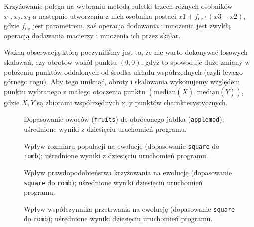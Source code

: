 \documentclass[a4paper,12pt,leqno]{article}
\newcommand{\median}{\mathrm{median}}
\begin{document}
Krzyżowanie polega na wybraniu metodą ruletki trzech różnych osobników $x_1, x_2, x_3$ a następnie utworzeniu z nich osobnika postaci
$x1 + f_\text{de}\cdot(x3-x2)$, gdzie $f_\text{de}$ jest parametrem, zaś operacja dodawania i mnożenia jest zwykłą operacją dodawania
macierzy i mnożenia ich przez skalar.

Ważną obserwacją którą poczyniliśmy jest to, że nie warto dokonywać losowych skalowań, czy obrotów wokół punktu $(0,0)$, gdyż to spowoduje duże
zmiany w położeniu punktów oddalonych od środka układu współrzędnych (czyli lewego górnego rogu). Aby tego uniknąć, obroty i skalowania wykonujemy
względem punktu wybranego z małego otoczenia punktu $(\median(\bar X), \median(\bar Y))$, gdzie $\bar X, \bar Y$ są zbiorami współrzędnych x, y
punktów charakterystycznych.

\begin{figure}\centering
\footnotesize\vspace{-2em}
\normalsize\caption{Dopasowanie owoców (\texttt{fruits}) do obróconego jabłka (\texttt{applemod}); uśrednione wyniki z dziesięciu uruchomień programu.}
\end{figure} 

\begin{figure}\centering
\footnotesize\vspace{-2em}
\normalsize\caption{Wpływ rozmiaru populacji na ewolucję (dopasowanie \texttt{square} do \texttt{romb}); uśrednione wyniki z dziesięciu uruchomień programu.}
\end{figure}
\begin{figure}\centering
\footnotesize\vspace{-2em}
\normalsize\caption{Wpływ prawdopodobieństwa krzyżowania na ewolucję (dopasowanie \texttt{square} do \texttt{romb}); uśrednione wyniki dziesięciu uruchomień programu.}
\end{figure}
\begin{figure}\centering
\footnotesize\vspace{-2em}
\normalsize\caption{Wpływ współczynnika przetrwania na ewolucję (dopasowanie \texttt{square} do \texttt{romb}); uśrednione wyniki dziesięciu uruchomień programu.}
\end{figure}
\end{document}
